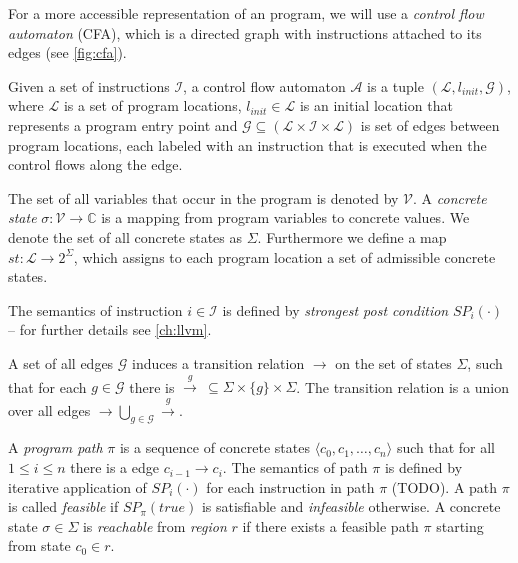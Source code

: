 For a more accessible representation of an \llvm program, we will use a \emph{control flow automaton} (CFA), which is a directed graph with \llvm instructions attached to its edges (see \autoref{fig:cfa}).

\begin{definition}
    Given a set of instructions $\mathcal{I}$, a control flow automaton $\mathcal{A}$ is a tuple $(\mathcal{L}, l_{\textit{init}}, \mathcal{G})$, where $\mathcal{L}$ is a set of program locations, $l_{\textit{init}} \in \mathcal{L}$ is an initial location that represents a program entry point and $\mathcal{G} \subseteq (\mathcal{L} \times \mathcal{I} \times \mathcal{L})$ is set of edges between program locations, each labeled with an instruction that is executed when the control flows along the edge.
\end{definition}

The set of all variables that occur in the \llvm program is denoted by $\mathcal{V}$. A \emph{concrete state} $\sigma : \mathcal{V} \rightarrow \mathbb{C}$ is a mapping from program variables to concrete values. We denote the set of all concrete states as $\Sigma$. Furthermore we define a map $st : \mathcal{L} \rightarrow 2^{\Sigma}$, which assigns to each program location a set of admissible concrete states. 

The semantics of instruction $i \in \mathcal{I}$ is defined by \emph{strongest post condition} $SP_{i}(\cdot)$ -- for further details see \autoref{ch:llvm}.

A set of all edges $\mathcal{G}$ induces a transition relation $\rightarrow$ on the set of states $\Sigma$, such that for each $g \in \mathcal{G}$ there is $\xrightarrow{g} \: \subseteq \Sigma \times \{g\} \times \Sigma$. The transition relation is a union over all edges $\rightarrow \bigcup_{g \in\mathcal{G}} \xrightarrow{g}$.

A \emph{program path} $\pi$ is a sequence of concrete states $\langle c_0, c_1, \dots, c_n \rangle$ such that for all $1 \leq i \leq n$ there is a edge $c_{i-1} \rightarrow c_i$. The semantics of path $\pi$ is defined by iterative application of $SP_{i}( \cdot )$ for each instruction in path $\pi$ (TODO). A path $\pi$ is called \emph{feasible} if $SP_{\pi}(\textit{true})$ is satisfiable and \emph{infeasible} otherwise. A concrete state $\sigma \in \Sigma$ is \emph{reachable} from \emph{region} $r$ if there exists a feasible path $\pi$ starting from state $c_0 \in r$.


